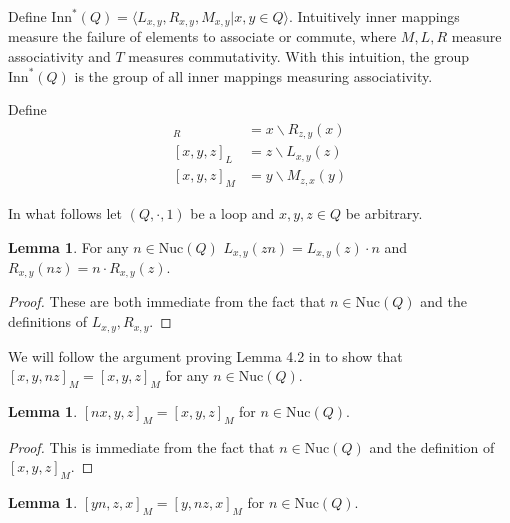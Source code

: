 \documentclass[12pt]{report}
\theoremstyle{definition}
\newtheorem{lem}[thm]{Lemma}
\newcommand{\ldv}{\backslash}       %
\newcommand{\nuc}{\text{Nuc}}       %
\newcommand{\inn}{\text{Inn}}       %
\begin{document}
Define $\inn^*(Q) = \langle L_{x, y}, R_{x, y}, M_{x, y} | x, y\in Q\rangle$. Intuitively inner
  mappings measure the failure of elements to associate or commute, where $M, L, R$ measure
  associativity and $T$ measures commutativity. With this intuition, the group $\inn^*(Q)$ is
  the group of all inner mappings measuring associativity.

Define
  \begin{align*}
    [x, y, z]_R &= x\ldv R_{z, y}(x)\\
    [x, y, z]_L &= z\ldv L_{x, y}(z)\\
    [x, y, z]_M &= y\ldv M_{z, x}(y)
  \end{align*}

In what follows let $(Q, \cdot, 1)$ be a loop and $x, y, z\in Q$ be arbitrary.

\begin{lem}\label{lem-LR}
  For any $n\in\nuc(Q)$ $L_{x, y}(zn) = L_{x, y}(z)\cdot n$ and $R_{x, y}(nz) = n\cdot R_{x, y}(z)$.
\end{lem}

\begin{proof}
  These are both immediate from the fact that $n\in\nuc(Q)$ and the definitions of $L_{x, y}, R_{x, y}$.
\end{proof}

We will follow the argument proving Lemma 4.2 in \cite{DiaCC} to show that
  $[x, y, nz]_M = [x, y, z]_M$ for any $n\in\nuc(Q)$.
\begin{lem}\label{lem-M1}
  $[nx, y, z]_M = [x, y, z]_M$ for $n\in\nuc(Q)$.
\end{lem}

\begin{proof}
  This is immediate from the fact that $n\in\nuc(Q)$ and the definition of $[x, y, z]_M$.
\end{proof}

\begin{lem}\label{lem-M2}
  $[yn, z, x]_M = [y, nz, x]_M$ for $n\in\nuc(Q)$.
\end{lem}
\end{document}
